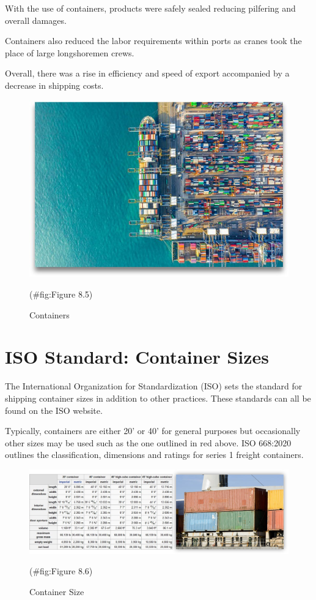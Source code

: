 \documentclass[
]{book}
\begin{document}
With the use of containers, products were safely sealed reducing pilfering and overall damages.

Containers also reduced the labor requirements within ports as cranes took the place of large longshoremen crews.

Overall, there was a rise in efficiency and speed of export accompanied by a decrease in shipping costs.

\begin{figure}

{\centering \includegraphics{./Images/seaport operation/Containers} 

}

\caption{Containers}(\#fig:Figure 8.5)
\end{figure}

\hypertarget{seaport-size}{%
\section{ISO Standard: Container Sizes}\label{seaport-size}}

The International Organization for Standardization (ISO) sets the standard for shipping container sizes in addition to other practices. These standards can all be found on the ISO website.

Typically, containers are either 20' or 40' for general purposes but occasionally other sizes may be used such as the one outlined in red above. ISO 668:2020 outlines the classification, dimensions and ratings for series 1 freight containers.

\begin{figure}

{\centering \includegraphics{./Images/seaport operation/Container Size} 

}

\caption{Container Size}(\#fig:Figure 8.6)
\end{figure}
\end{document}
